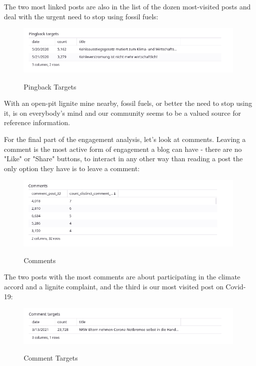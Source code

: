 The two most linked posts are also in the list of the dozen most-visited posts and deal with the urgent need to stop using fossil fuels:

\begin{figure}[H]
\centering
\caption {Pingback Targets}
\includegraphics[width=\linewidth]{images/figure16.png}
\label{fig:pingbackTargets}
\end{figure}

With an open-pit lignite mine nearby, fossil fuels, or better the need to stop using it, is on everybody's mind and our community seems to be a valued source for reference information.

For the final part of the engagement analysis, let's look at comments. Leaving a comment is the most active form of engagement a blog can have - there are no "Like" or "Share" buttons, to interact in any other way than reading a post the only option they have is to leave a comment:

\begin{figure}[H]
\centering
\caption {Comments}
\includegraphics[width=\linewidth]{images/figure17.png}
\label{fig:comments}
\end{figure}

The two posts with the most comments are about participating in the climate accord and a lignite complaint, and the third is our most visited post on Covid-19:

\begin{figure}[H]
\centering
\caption {Comment Targets}
\includegraphics[width=\linewidth]{images/figure18.png}
\label{fig:commentTarget}
\end{figure}

